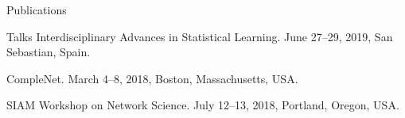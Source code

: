 \documentclass{resume} %
\begin{document}
\begin{rSection}{Publications}
\printbibliography[heading=none, notkeyword=preprint]
\end{rSection}

\begin{rSection}{Talks}
Interdisciplinary Advances in Statistical Learning. June 27--29, 2019, San Sebastian, Spain.

CompleNet. March 4--8, 2018, Boston, Massachusetts, USA.

SIAM Workshop on Network Science. July 12--13, 2018, Portland, Oregon, USA.
\end{rSection}
\end{document}
